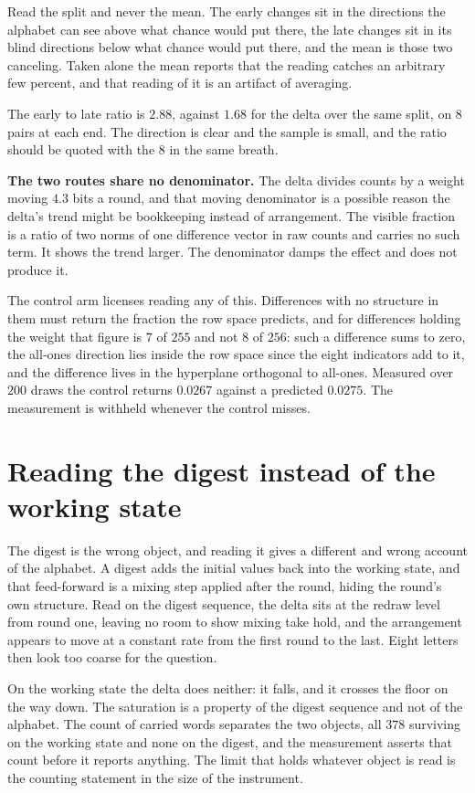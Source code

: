 Read the split and never the mean. The early changes sit in the directions the alphabet can see above what chance would put there, the late changes sit in its blind directions below what chance would put there, and the mean is those two canceling. Taken alone the mean reports that the reading catches an arbitrary few percent, and that reading of it is an artifact of averaging.

The early to late ratio is \(2.88\), against \(1.68\) for the delta over the same split, on \(8\) pairs at each end. The direction is clear and the sample is small, and the ratio should be quoted with the \(8\) in the same breath.

\textbf{The two routes share no denominator.} The delta divides counts by a weight moving \(4.3\) bits a round, and that moving denominator is a possible reason the delta's trend might be bookkeeping instead of arrangement. The visible fraction is a ratio of two norms of one difference vector in raw counts and carries no such term. It shows the trend larger. The denominator damps the effect and does not produce it.

The control arm licenses reading any of this. Differences with no structure in them must return the fraction the row space predicts, and for differences holding the weight that figure is \(7\) of \(255\) and not \(8\) of \(256\): such a difference sums to zero, the all-ones direction lies inside the row space since the eight indicators add to it, and the difference lives in the hyperplane orthogonal to all-ones. Measured over \(200\) draws the control returns \(0.0267\) against a predicted \(0.0275\). The measurement is withheld whenever the control misses.

\section{Reading the digest instead of the working state}

The digest is the wrong object, and reading it gives a different and wrong account of the alphabet. A digest adds the initial values back into the working state, and that feed-forward is a mixing step applied after the round, hiding the round's own structure. Read on the digest sequence, the delta sits at the redraw level from round one, leaving no room to show mixing take hold, and the arrangement appears to move at a constant rate from the first round to the last. Eight letters then look too coarse for the question.

On the working state the delta does neither: it falls, and it crosses the floor on the way down. The saturation is a property of the digest sequence and not of the alphabet. The count of carried words separates the two objects, all \(378\) surviving on the working state and none on the digest, and the measurement asserts that count before it reports anything. The limit that holds whatever object is read is the counting statement in the size of the instrument.

